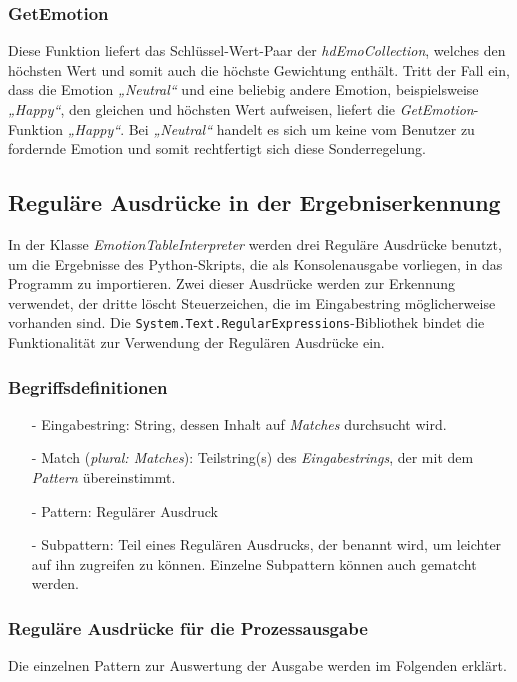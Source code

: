\documentclass[12pt,a4paper,headinclude,twoside, plainheadsepline, open=right,numbers=noenddot]{scrreprt}
\begin{document}
\subsubsection{GetEmotion}
Diese Funktion liefert das Schl\"{u}ssel-Wert-Paar der \textit{hdEmoCollection}, welches den h\"{o}chsten Wert und somit auch die h\"{o}chste Gewichtung enth\"{a}lt. Tritt der Fall ein, dass die Emotion \textit{„Neutral“} und eine beliebig andere Emotion, beispielsweise \textit{„Happy“}, den gleichen und h\"{o}chsten Wert aufweisen, liefert die \textit{GetEmotion}-Funktion \textit{„Happy“}. Bei \textit{„Neutral“} handelt es sich um keine vom Benutzer zu fordernde Emotion und somit rechtfertigt sich diese Sonderregelung.

\subsection{Regul\"{a}re Ausdr\"{u}cke in der Ergebniserkennung}
In der Klasse \textit{EmotionTableInterpreter} werden drei Regul\"{a}re Ausdr\"{u}cke benutzt, um die Ergebnisse des Python-Skripts, die als Konsolenausgabe vorliegen, in das Programm zu importieren. Zwei dieser Ausdr\"{u}cke werden zur Erkennung verwendet, der dritte l\"{o}scht Steuerzeichen, die im Eingabestring m\"{o}glicherweise vorhanden sind. Die \texttt{System.Text.RegularExpressions}-Bibliothek bindet die Funktionalit\"{a}t zur Verwendung der Regul\"{a}ren Ausdr\"{u}cke ein.
\subsubsection{Begriffsdefinitionen}
\begin{itemize}
\item[-] Eingabestring: String, dessen Inhalt auf \textit{Matches} durchsucht wird.
\item[-] Match (\textit{plural: Matches}): Teilstring(s) des \textit{Eingabestrings}, der mit dem \textit{Pattern} \"{u}bereinstimmt.
\item[-] Pattern: Regul\"{a}rer Ausdruck
\item[-] Subpattern: Teil eines Regul\"{a}ren Ausdrucks, der benannt wird, um leichter auf ihn zugreifen zu k\"{o}nnen. Einzelne Subpattern k\"{o}nnen auch gematcht werden. 
\end{itemize}
\subsubsection{Regul\"{a}re Ausdr\"{u}cke f\"{u}r die Prozessausgabe}
Die einzelnen Pattern zur Auswertung der Ausgabe werden im Folgenden erkl\"{a}rt.
\end{document}
